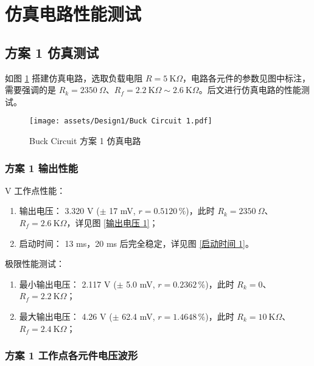 \documentclass[UTF8]{article}
\def\kO{\ \mathrm{K}\Omega}
\def\KO{\ \mathrm{K}\Omega}
\def\kO{\ \mathrm{K}\Omega}
\def\KO{\ \mathrm{K}\Omega}
\theoremstyle{MyLineTheoremStyle} %
\theoremstyle{MyBlockTheoremStyle} %
\theoremstyle{MySubsubsectionStyle} %
\begin{document}
\section{仿真电路性能测试}

\subsection{方案 1 仿真测试}
如图 \ref{方案 1 仿真电路} 搭建仿真电路，选取负载电阻 $R = 5 \kO$，电路各元件的参数见图中标注，需要强调的是 $R_k = 2350\ \Omega$、$R_f =  2.2\KO \sim 2.6 \KO$。后文进行仿真电路的性能测试。

\begin{figure}[H]\centering
    \texttt{[image: assets/Design1/Buck Circuit 1.pdf]}
    \caption{Buck Circuit 方案 1 仿真电路}
    \label{方案 1 仿真电路}
\end{figure}

\subsubsection{方案 1 输出性能}
 V 工作点性能：
\begin{enumerate}
\item 输出电压： 3.320 V ($\pm$ 17 mV, $r = 0.5120 \,\%$)，此时 $R_k = 2350 \ \Omega$、$R_f =  2.6 \KO$，详见图 \ref{输出电压 1}；
\item 启动时间： 13 ms，20 ms 后完全稳定，详见图 \ref{启动时间 1}。
\end{enumerate}

\noindent 极限性能测试：
\begin{enumerate}
\item 最小输出电压： 2.117 V ($\pm$ 5.0 mV, $r = 0.2362 \,\%$)，此时 $R_k = 0$、$R_f =  2.2 \KO$；
\item 最大输出电压： 4.26 V ($\pm$ 62.4 mV, $r = 1.4648 \,\%$)，此时 $R_k = 10 \KO$、$R_f =  2.4\KO$；
\end{enumerate}


\subsubsection{方案 1 工作点各元件电压波形}
\end{document}
